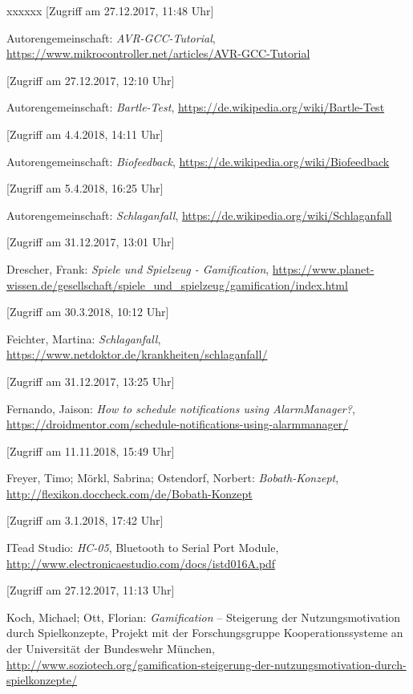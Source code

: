 \begin{thebibliography}{xxxxxx}
[Zugriff am 27.12.2017, 11:48 Uhr]

 Autorengemeinschaft: \textit{AVR-GCC-Tutorial}, \url{https://www.mikrocontroller.net/articles/AVR-GCC-Tutorial}

[Zugriff am 27.12.2017, 12:10 Uhr]

 Autorengemeinschaft: \textit{Bartle-Test}, \url{https://de.wikipedia.org/wiki/Bartle-Test}

[Zugriff am 4.4.2018, 14:11 Uhr]

 Autorengemeinschaft: \textit{Biofeedback}, \url{https://de.wikipedia.org/wiki/Biofeedback}

[Zugriff am 5.4.2018, 16:25 Uhr]

 Autorengemeinschaft: \textit{Schlaganfall}, \url{https://de.wikipedia.org/wiki/Schlaganfall}

[Zugriff am 31.12.2017, 13:01 Uhr]

 Drescher, Frank: \textit{Spiele und Spielzeug - Gamification}, \url{https://www.planet-wissen.de/gesellschaft/spiele_und_spielzeug/gamification/index.html}

[Zugriff am 30.3.2018, 10:12 Uhr]

 Feichter, Martina: \textit{Schlaganfall}, \url{https://www.netdoktor.de/krankheiten/schlaganfall/}

[Zugriff am 31.12.2017, 13:25 Uhr]

 Fernando, Jaison: \textit{How to schedule notifications using AlarmManager?}, \url{https://droidmentor.com/schedule-notifications-using-alarmmanager/}

[Zugriff am 11.11.2018, 15:49 Uhr]

 Freyer, Timo; Mörkl, Sabrina; Ostendorf, Norbert: \textit{Bobath-Konzept}, \url{http://flexikon.doccheck.com/de/Bobath-Konzept}

[Zugriff am 3.1.2018, 17:42 Uhr]

 ITead Studio: \textit{HC-05}, Bluetooth to Serial Port Module, \url{http://www.electronicaestudio.com/docs/istd016A.pdf}

[Zugriff am 27.12.2017, 11:13 Uhr]

 Koch, Michael; Ott, Florian: \textit{Gamification} – Steigerung der Nutzungsmotivation durch Spielkonzepte, Projekt mit der Forschungsgruppe Kooperationssysteme an der Universität der Bundeswehr München, \url{http://www.soziotech.org/gamification-steigerung-der-nutzungsmotivation-durch-spielkonzepte/}


\end{thebibliography}
